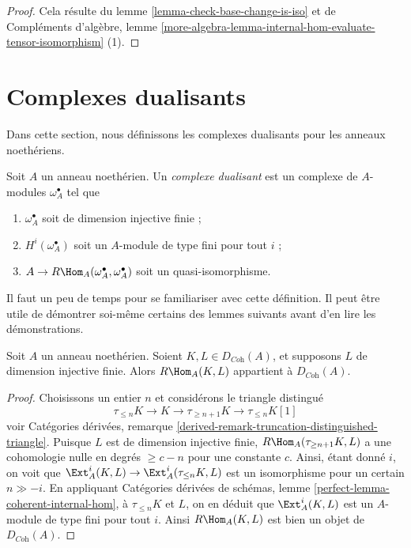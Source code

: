 \begin{proof}
Cela résulte du lemme \ref{lemma-check-base-change-is-iso} et de
Compléments d'algèbre, lemme \ref{more-algebra-lemma-internal-hom-evaluate-tensor-isomorphism} (1).
\end{proof}







\section{Complexes dualisants}
\label{section-dualizing}

\noindent
Dans cette section, nous définissons les complexes dualisants pour les anneaux noethériens.

\begin{definition}
\label{definition-dualizing}
Soit $A$ un anneau noethérien. Un {\it complexe dualisant}
est un complexe de $A$-modules $\omega_A^\bullet$ tel que
\begin{enumerate}
\item $\omega_A^\bullet$ soit de dimension injective finie ;
\item $H^i(\omega_A^\bullet)$ soit un $A$-module de type fini pour tout $i$ ;
\item $A \to R\Hom_A(\omega_A^\bullet, \omega_A^\bullet)$
soit un quasi-isomorphisme.
\end{enumerate}
\end{definition}

\noindent
Il faut un peu de temps pour se familiariser avec cette définition.
Il peut être utile de démontrer soi-même certains des lemmes suivants
avant d'en lire les démonstrations.

\begin{lemma}
\label{lemma-finite-ext-into-bounded-injective}
Soit $A$ un anneau noethérien. Soient $K, L \in D_{\textit{Coh}}(A)$,
et supposons $L$ de dimension injective finie.
Alors $R\Hom_A(K, L)$ appartient à $D_{\textit{Coh}}(A)$.
\end{lemma}

\begin{proof}
Choisissons un entier $n$ et considérons le triangle distingué
$$
\tau_{\leq n}K \to K \to \tau_{\geq n + 1}K \to \tau_{\leq n}K[1]
$$
voir Catégories dérivées, remarque \ref{derived-remark-truncation-distinguished-triangle}.
Puisque $L$ est de dimension injective finie, $R\Hom_A(\tau_{\geq n + 1}K, L)$
a une cohomologie nulle en degrés $\geq c - n$ pour une constante $c$.
Ainsi, étant donné $i$, on voit que $\Ext^i_A(K, L) \to \Ext^i_A(\tau_{\leq n}K, L)$
est un isomorphisme pour un certain $n \gg - i$.
En appliquant Catégories dérivées de schémas, lemme \ref{perfect-lemma-coherent-internal-hom},
à $\tau_{\leq n}K$ et $L$, on en déduit que $\Ext^i_A(K, L)$
est un $A$-module de type fini pour tout $i$.
Ainsi $R\Hom_A(K, L)$ est bien un objet de $D_{\textit{Coh}}(A)$.
\end{proof}

